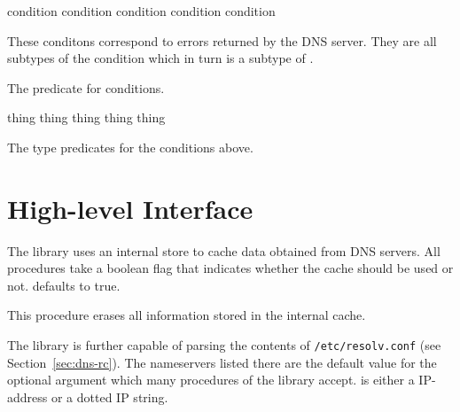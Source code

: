   \begin{desc}
    
  \end{desc}
 {condition}
 {condition}
 {condition}
 {condition}
 {condition}
\begin{desc}
  These conditons correspond to errors returned by the DNS server.
  They are all subtypes of the  condition which
  in turn is a subtype of .
\end{desc}
\begin{desc}
  The predicate for  conditions.
\end{desc}

 {\boolean}
 {\boolean}
 {\boolean}
 {\boolean}
 {\boolean}
 {\boolean}
 {\boolean}
 {thing} {\boolean}
 {thing} {\boolean}
 {thing} {\boolean}
 {thing} {\boolean}
 {thing} {\boolean}
\begin{desc}
  The type predicates for the conditions above.
\end{desc}

\section{High-level Interface}
\def\ipaddr{IP-address\xspace}
\def\ipstring{IP-string\xspace}
\def\fqdn{FQDN\xspace}

The library uses an internal store to cache data obtained from DNS
servers. All procedures take a boolean flag  that
indicates whether the cache should be used or not. 
defaults to true.

\begin{desc}
  This procedure erases all information stored in the internal cache.
\end{desc}

The library is further capable of parsing the contents of
\texttt{/etc/resolv.conf} (see Section~\ref{sec:dns-rc}). The
nameservers listed there are the default value for the optional
argument  which many procedures of the library
accept.  is either a \ipaddr or a dotted IP string.

